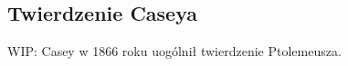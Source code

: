 
\color{red}

\subsection{Twierdzenie Caseya}
WIP: Casey w 1866 roku uogólnił twierdzenie Ptolemeusza.

\color{black}

%